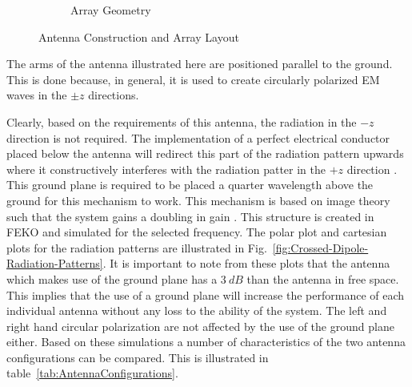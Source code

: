 \documentclass[11pt]{witseiepaper}
\begin{document}
\begin{figure}[htb]
\begin{subfigure}{.3\textwidth}
            \caption{Array Geometry}
            \label{fig:ArrayGeometry}  
            \end{subfigure}
\caption{Antenna Construction and Array Layout}
\label{fig:AntennaConstructionArrayLayout}
\end{figure}

The arms of the antenna illustrated here are positioned parallel to the ground. This is done because, in general, it is used to create circularly polarized EM waves in the $\pm z$ directions.

Clearly, based on the requirements of this antenna, the radiation in the $-z$ direction is not required. The implementation of a perfect electrical conductor placed below the antenna will redirect this part of the radiation pattern upwards where it constructively interferes with the radiation patter in the $+z$ direction \cite[p.~110-111]{IEEECrossedDipole}. This ground plane is required to be placed a quarter wavelength above the ground for this mechanism to work. This mechanism is based on image theory such that the system gains a doubling in gain \cite[p.~111]{IEEECrossedDipole}. This structure is created in FEKO and simulated for the selected frequency. The polar plot and cartesian plots for the radiation patterns are illustrated in Fig.~\ref{fig:Crossed-Dipole-Radiation-Patterns}. It is important to note from these plots that the antenna which makes use of the ground plane has a $3~dB$ than the antenna in free space. This implies that the use of a ground plane will increase the performance of each individual antenna without any loss to the ability of the system. The left and right hand circular polarization are not affected by the use of the ground plane either. Based on these simulations a number of characteristics of the two antenna configurations can be compared. This is illustrated in table~\ref{tab:AntennaConfigurations}.
\end{document}
